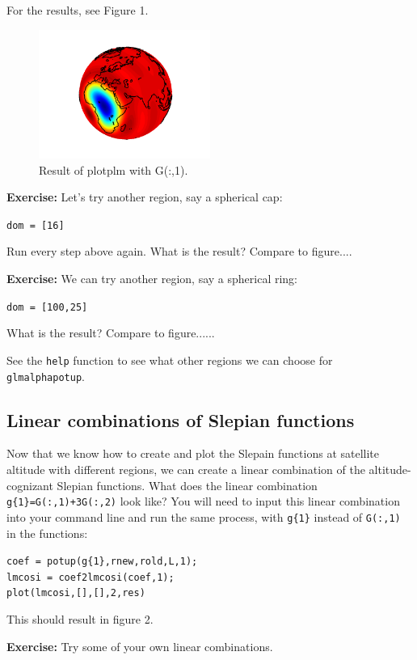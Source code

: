 \documentclass[11pt]{article}
\begin{document}
For the results, see Figure 1.
\begin{figure}
  \centering
  \includegraphics[width=0.5\textwidth]{ch3plot.png}
  \caption{Result of plotplm with G(:,1).}
\label{plotplm}
\end{figure}

\textbf{Exercise:} Let's try another region, say a spherical cap:

\verb+dom = [16]+

Run every step above again.  What is the result?  Compare to figure....

\textbf{Exercise:} We can try another region, say a spherical ring:

\verb+dom = [100,25]+

What is the result? Compare to figure......

See the \verb+help+ function to see what other regions we can choose for \verb+glmalphapotup+.

\subsection{Linear combinations of Slepian functions}

Now that we know how to create and plot the Slepain functions at satellite altitude with different regions, we can create a linear combination of the altitude-cognizant Slepian functions.  What does the linear combination \verb|g{1}=G(:,1)+3G(:,2)| look like?  You will need to input this linear combination into your command line and run the same process, with \verb+g{1}+ instead of \verb+G(:,1)+ in the functions:

\verb+coef = potup(g{1},rnew,rold,L,1);+\\
\verb+lmcosi = coef2lmcosi(coef,1);+\\
\verb+plot(lmcosi,[],[],2,res)+

This should result in figure 2.

\textbf{Exercise:} Try some of your own linear combinations.
\end{document}
